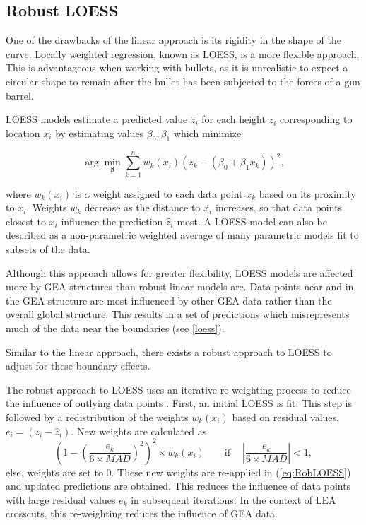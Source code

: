 \documentclass[12pt]{article}
\begin{document}
\subsection{Robust LOESS}

One of the drawbacks of the linear approach is its rigidity in the shape
of the curve. Locally weighted regression, known as LOESS, is a more
flexible approach. This is advantageous when working with bullets, as it
is unrealistic to expect a circular shape to remain after the bullet has
been subjected to the forces of a gun barrel.

LOESS models estimate a predicted value \(\widehat{z}_i\) for each
height \(z_i\) corresponding to location \(x_i\) by estimating values
\(\beta_0, \beta_1\) which minimize

\begin{equation}\label{eq:RobLOESS} \arg\min_{\mathbf{\beta}} \sum_{k=1}^n w_k(x_{i})\left(z_{k} - (\beta_0 + \beta_1x_k)\right)^2,\end{equation}

where \(w_k(x_i)\) is a weight assigned to each data point \(x_k\) based
on its proximity to \(x_i\). Weights \(w_k\) decrease as the distance to
\(x_i\) increases, so that data points closest to \(x_i\) influence the
prediction \(\widehat{z}_i\) most. A LOESS model can also be described
as a non-parametric weighted average of many parametric models fit to
subsets of the data.

Although this approach allows for greater flexibility, LOESS models are
affected more by GEA structures than robust linear models are. Data
points near and in the GEA structure are most influenced by other GEA
data rather than the overall global structure. This results in a set of
predictions which misrepresents much of the data near the boundaries
(see \autoref{loess}).

Similar to the linear approach, there exists a robust approach to LOESS
to adjust for these boundary effects.

The robust approach to LOESS uses an iterative re-weighting process to
reduce the influence of outlying data points \citep[see][]{Cleveland1}.
First, an initial LOESS is fit. This step is followed by a
redistribution of the weights \(w_k(x_i)\) based on residual values,
\(e_i = (z_i - \widehat{z}_i)\). New weights are calculated as
\[\left(1-\left(\frac{e_k}{6\times MAD}\right)^2\right)^2 \times w_k(x_i) \quad \quad \mbox{if}\quad \ \left|\frac{e_k}{6\times MAD}\right| < 1,\]
else, weights are set to 0. These new weights are re-applied in
(\ref{eq:RobLOESS}) and updated predictions are obtained. This reduces
the influence of data points with large residual values \(e_k\) in
subsequent iterations. In the context of LEA crosscuts, this
re-weighting reduces the influence of GEA data.
\end{document}
